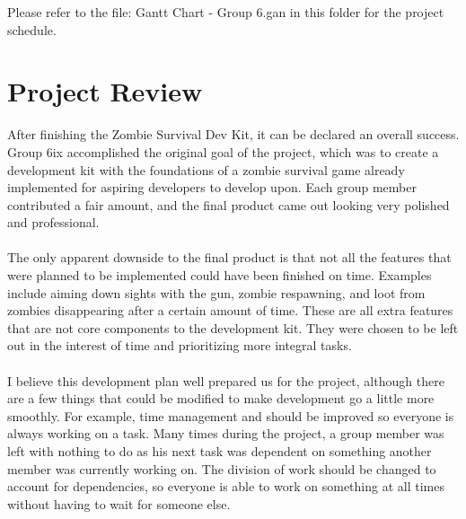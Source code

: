 \documentclass{article}
\begin{document}
Please refer to the file: Gantt Chart - Group 6.gan in this folder for the project schedule.

\section{Project Review}

{\color{magenta} After finishing the Zombie Survival Dev Kit, it can be declared an overall success. Group 6ix accomplished the original goal of the project,
which was to create a development kit with the foundations of a zombie survival game already implemented for aspiring developers to develop upon. Each 
group member contributed a fair amount, and the final product came out looking very polished and professional.} \\ \\
{\color{magenta} The only apparent downside to the final product is that not all the features that were planned to be implemented could have been finished on
time. Examples include aiming down sights with the gun, zombie respawning, and loot from zombies disappearing after a certain amount of time. These are
all extra features that are not core components to the development kit. They were chosen to be left out in the interest of time and prioritizing more integral tasks.} \\ \\
{\color{magenta} I believe this development plan well prepared us for the project, although there are a few things that could be modified to make development go a little more smoothly. For example, time management and should be improved so everyone is always working on a task. Many times during the project, a group member was left with nothing to do as his next task was dependent on something another member was currently working on. The division of work should be changed to account for dependencies, so everyone is able to work on something at all times without having to wait for someone else.} 
\end{document}
